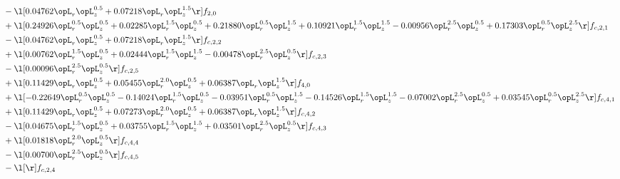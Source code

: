 \begin{alignat}{2}
& - \l[  0.04762 \opL_r \opL_z^{0.5} +  0.07218 \opL_r \opL_z^{1.5}  \r] f_{2,0} \nonumber \\ 
& + \l[  0.24926 \opL_r^{0.5} \opL_z^{0.5} +  0.02285 \opL_r^{1.5} \opL_z^{0.5} +  0.21880 \opL_r^{0.5} \opL_z^{1.5} +  0.10921 \opL_r^{1.5} \opL_z^{1.5}   -0.00956 \opL_r^{2.5} \opL_z^{0.5} +  0.17303 \opL_r^{0.5} \opL_z^{2.5}  \r] f_{c,2,1} \nonumber \\ 
& - \l[  0.04762 \opL_r \opL_z^{0.5} +  0.07218 \opL_r \opL_z^{1.5}  \r] f_{c,2,2} \nonumber \\ 
& + \l[  0.00762 \opL_r^{1.5} \opL_z^{0.5} +  0.02444 \opL_r^{1.5} \opL_z^{1.5}   -0.00478 \opL_r^{2.5} \opL_z^{0.5}  \r] f_{c,2,3} \nonumber \\ 
& - \l[  0.00096 \opL_r^{2.5} \opL_z^{0.5}  \r] f_{c,2,5} \nonumber \\ 
& + \l[  0.11429 \opL_r \opL_z^{0.5} +  0.05455 \opL_r^{2.0} \opL_z^{0.5} +  0.06387 \opL_r \opL_z^{1.5}  \r] f_{4,0} \nonumber \\ 
& + \l[  -0.22649 \opL_r^{0.5} \opL_z^{0.5}   -0.14024 \opL_r^{1.5} \opL_z^{0.5}   -0.03951 \opL_r^{0.5} \opL_z^{1.5}   -0.14526 \opL_r^{1.5} \opL_z^{1.5}   -0.07002 \opL_r^{2.5} \opL_z^{0.5} +  0.03545 \opL_r^{0.5} \opL_z^{2.5}  \r] f_{c,4,1} \nonumber \\ 
& + \l[  0.11429 \opL_r \opL_z^{0.5} +  0.07273 \opL_r^{2.0} \opL_z^{0.5} +  0.06387 \opL_r \opL_z^{1.5}  \r] f_{c,4,2} \nonumber \\ 
& - \l[  0.04675 \opL_r^{1.5} \opL_z^{0.5} +  0.03755 \opL_r^{1.5} \opL_z^{1.5} +  0.03501 \opL_r^{2.5} \opL_z^{0.5}  \r] f_{c,4,3} \nonumber \\ 
& + \l[  0.01818 \opL_r^{2.0} \opL_z^{0.5}  \r] f_{c,4,4} \nonumber \\ 
& - \l[  0.00700 \opL_r^{2.5} \opL_z^{0.5}  \r] f_{c,4,5} \nonumber \\ 
& - \l[  \r] f_{c,2,4} \nonumber \\ 
\end{alignat} 


